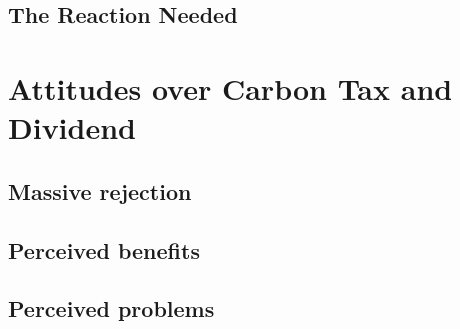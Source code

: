 \documentclass[11pt]{article}
\begin{document}
    \subsection{The Reaction Needed}



\section{Attitudes over Carbon Tax and Dividend}


    \subsection{Massive rejection}


    \subsection{Perceived benefits}


    \subsection{Perceived problems}

\end{document}
